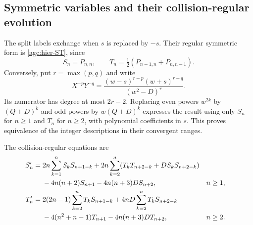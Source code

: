 \subsection{Symmetric variables and their collision-regular evolution}

The split labels exchange when $s$ is replaced by $-s$. Their
regular symmetric form is \eqref{agc:hier-ST}, since
\begin{equation}
 S_n=P_{n,n},\qquad
 T_n=\tfrac12(P_{n-1,n}+P_{n,n-1}).
 \label{agc:hier-change}
\end{equation}
Conversely, put $r=\max(p,q)$ and write
\[
 X^{-p}Y^{-q}
     =\frac{(w-s)^{r-p}(w+s)^{r-q}}{(w^2-D)^r}.
\]
Its numerator has degree at most $2r-2$. Replacing even powers
$w^{2k}$ by $(Q+D)^k$ and odd powers by $w(Q+D)^k$ expresses
the result using only $S_n$ for $n\ge1$ and $T_n$ for $n\ge2$,
with polynomial coefficients in $s$. This proves equivalence of the
integer descriptions in their convergent ranges.

The collision-regular equations are
\begin{align}
 S_n'={}&2n\sum_{k=1}^{n}S_kS_{n+1-k}
       +2n\sum_{k=2}^{n}(T_kT_{n+2-k}+DS_kS_{n+2-k})\notag\\
       &-4n(n+2)S_{n+1}-4n(n+3)DS_{n+2},&&n\ge1,
                                                  \label{agc:hier-S}\\
 T_n'={}&2(2n-1)\sum_{k=2}^{n}T_kS_{n+1-k}
       +4nD\sum_{k=2}^{n}T_kS_{n+2-k}\notag\\
       &-4(n^2+n-1)T_{n+1}-4n(n+3)DT_{n+2},&&n\ge2.
                                                  \label{agc:hier-T}
\end{align}

